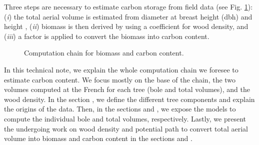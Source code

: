 Three steps are necessary to estimate carbon storage from field data (see Fig. \ref{fig::scheme}): (\textit{i}) the total aerial volume is estimated from diameter at breast height (dbh) and height \parencite{Vallet2006}, (\textit{ii}) biomass is then derived by using a coefficient for wood density, and (\textit{iii}) a factor is applied to convert the biomass into carbon content. \\

\begin{figure}[h]
    \centering
	
	\caption{Computation chain for biomass and carbon content.\label{fig::scheme}}
\end{figure}

In this technical note, we explain the whole computation chain we foresee to estimate carbon content. We focus mostly on the base of the chain, \ie the two volumes computed at the French \NFI{} for each tree (bole and total volumes), and the wood density. In the section , we define the different tree components and explain the origins of the data. Then, in the sections  and , we expose the models to compute the individual bole and total volumes, respectively. Lastly, we present the undergoing work on wood density and potential path to convert total aerial volume into biomass and carbon content in the sections  and .
